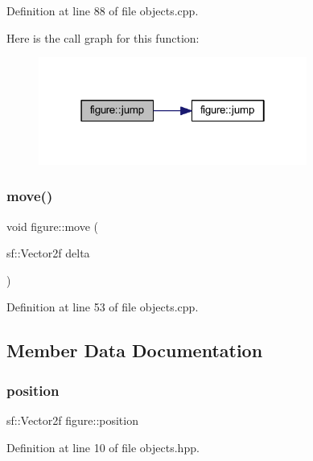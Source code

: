 Definition at line 88 of file objects.\+cpp.

Here is the call graph for this function\+:
\nopagebreak
\begin{figure}[H]
\begin{center}
\leavevmode
\includegraphics[width=250pt]{classfigure_a25bfb0a452b2b2fe60f7f01b08dab423_cgraph}
\end{center}
\end{figure}
\mbox{\label{classfigure_ac7592a3b4cb4210fbd114c42d015c4e7}} 
\subsubsection{\texorpdfstring{move()}{move()}}
{\footnotesize\ttfamily void figure\+::move (\begin{DoxyParamCaption}\item[{sf\+::\+Vector2f}]{delta }\end{DoxyParamCaption})\hspace{0.3cm}{\ttfamily [virtual]}}



Definition at line 53 of file objects.\+cpp.



\subsection{Member Data Documentation}
\mbox{\label{classfigure_a2196c51490b69027860fdb015913de19}} 
\subsubsection{\texorpdfstring{position}{position}}
{\footnotesize\ttfamily sf\+::\+Vector2f figure\+::position}



Definition at line 10 of file objects.\+hpp.

